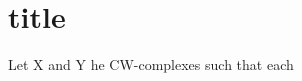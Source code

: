 \chapter{title}\label{app-A}



\begin{theorem}\label{thm-A-6}
	Let X and Y he CW-complexes such that each
\end{theorem}